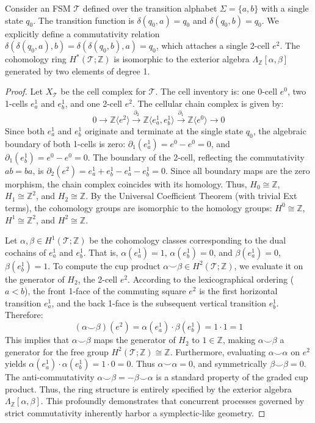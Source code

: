 \begin{theorem}
Consider an FSM $\mathcal{T}$ defined over the transition alphabet $\Sigma = \{a, b\}$ with a single state $q_0$. The transition function is $\delta(q_0, a) = q_0$ and $\delta(q_0, b) = q_0$. We explicitly define a commutativity relation $\delta(\delta(q_0, a), b) = \delta(\delta(q_0, b), a) = q_0$, which attaches a single 2-cell $e^2$.
The cohomology ring $H^*(\mathcal{T}; \mathbb{Z})$ is isomorphic to the exterior algebra $\Lambda_\mathbb{Z}[\alpha, \beta]$ generated by two elements of degree 1.
\end{theorem}
\begin{proof}
Let $X_\mathcal{T}$ be the cell complex for $\mathcal{T}$. The cell inventory is: one 0-cell $e^0$, two 1-cells $e^1_a$ and $e^1_b$, and one 2-cell $e^2$.
The cellular chain complex is given by:
\[ 0 \to \mathbb{Z} \langle e^2 \rangle \xrightarrow{\partial_2} \mathbb{Z} \langle e^1_a, e^1_b \rangle \xrightarrow{\partial_1} \mathbb{Z} \langle e^0 \rangle \to 0 \]
Since both $e^1_a$ and $e^1_b$ originate and terminate at the single state $q_0$, the algebraic boundary of both 1-cells is zero: $\partial_1(e^1_a) = e^0 - e^0 = 0$, and $\partial_1(e^1_b) = e^0 - e^0 = 0$.
The boundary of the 2-cell, reflecting the commutativity $ab = ba$, is $\partial_2(e^2) = e^1_a + e^1_b - e^1_a - e^1_b = 0$.
Since all boundary maps are the zero morphism, the chain complex coincides with its homology. Thus, $H_0 \cong \mathbb{Z}$, $H_1 \cong \mathbb{Z}^2$, and $H_2 \cong \mathbb{Z}$.
By the Universal Coefficient Theorem (with trivial Ext terms), the cohomology groups are isomorphic to the homology groups: $H^0 \cong \mathbb{Z}$, $H^1 \cong \mathbb{Z}^2$, and $H^2 \cong \mathbb{Z}$.

Let $\alpha, \beta \in H^1(\mathcal{T}; \mathbb{Z})$ be the cohomology classes corresponding to the dual cochains of $e^1_a$ and $e^1_b$. That is, $\alpha(e^1_a) = 1$, $\alpha(e^1_b) = 0$, and $\beta(e^1_a) = 0$, $\beta(e^1_b) = 1$.
To compute the cup product $\alpha \smile \beta \in H^2(\mathcal{T}; \mathbb{Z})$, we evaluate it on the generator of $H_2$, the 2-cell $e^2$.
According to the lexicographical ordering ($a < b$), the front 1-face of the commuting square $e^2$ is the first horizontal transition $e^1_a$, and the back 1-face is the subsequent vertical transition $e^1_b$. 
Therefore:
\[ (\alpha \smile \beta)(e^2) = \alpha(e^1_a) \cdot \beta(e^1_b) = 1 \cdot 1 = 1 \]
This implies that $\alpha \smile \beta$ maps the generator of $H_2$ to $1 \in \mathbb{Z}$, making $\alpha \smile \beta$ a generator for the free group $H^2(\mathcal{T}; \mathbb{Z}) \cong \mathbb{Z}$.
Furthermore, evaluating $\alpha \smile \alpha$ on $e^2$ yields $\alpha(e^1_a) \cdot \alpha(e^1_b) = 1 \cdot 0 = 0$. Thus $\alpha \smile \alpha = 0$, and symmetrically $\beta \smile \beta = 0$. The anti-commutativity $\alpha \smile \beta = -\beta \smile \alpha$ is a standard property of the graded cup product.
Thus, the ring structure is entirely specified by the exterior algebra $\Lambda_\mathbb{Z}[\alpha, \beta]$. This profoundly demonstrates that concurrent processes governed by strict commutativity inherently harbor a symplectic-like geometry.
\end{proof}

